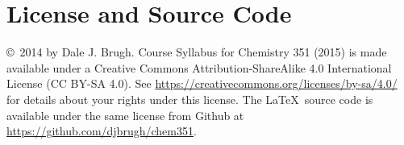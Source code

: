 \documentclass[letterpaper,oneside,onecolumn,11pt,article]{memoir}
\begin{document}
\section{License and Source Code}
\copyright\ 2014 by Dale J. Brugh. Course Syllabus for Chemistry 351 (2015) is made available under a Creative Commons Attribution-ShareAlike 4.0 International License (CC BY-SA 4.0). See \href{https://creativecommons.org/licenses/by-sa/4.0/}{https://creativecommons.org/licenses/by-sa/4.0/} for details about your rights under this license. The \LaTeX\ source code is available under the same license from Github at \href{https://github.com/djbrugh/chem351}{https://github.com/djbrugh/chem351}. 
\end{document}
